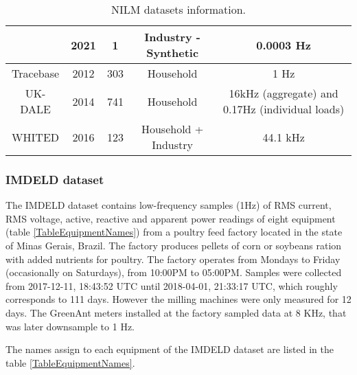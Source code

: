 \begin{table}[H]
{\begin{tabular}{|c|c|c|c|c|}
                                & 2021 & 1    & Industry - Synthetic   & 0.0003 Hz                          \\ \hline
Tracebase \cite{Tracebase}      & 2012 & 303  & Household              & 1 Hz                               \\ \hline
UK-DALE \cite{UK-DALE}          & 2014 & 741  & Household              & 16kHz (aggregate) and 0.17Hz (individual loads) \\ \hline
WHITED \cite{WHITED}            & 2016 & 123  & Household + Industry   & 44.1 kHz                           \\ \hline
\end{tabular}}
\caption{NILM datasets information.}
\label{TableNILMDatasets}
\end{table}



\subsubsection{IMDELD dataset}
The IMDELD dataset contains low-frequency samples (1Hz) of RMS current, RMS voltage, active, reactive and apparent power readings of eight equipment (table \ref{TableEquipmentNames}) from a poultry feed factory located in the state of Minas Gerais, Brazil. The factory produces pellets of corn or soybeans ration with added nutrients for poultry. The factory operates from Mondays to Friday (occasionally on Saturdays), from 10:00PM to 05:00PM. Samples were collected from 2017-12-11, 18:43:52 UTC until 2018-04-01, 21:33:17 UTC, which roughly corresponds to 111 days. However the milling machines were only measured for 12 days. The GreenAnt meters installed at the factory sampled data at 8 KHz, that was later downsample to 1 Hz.

The names assign to each equipment of the IMDELD dataset are listed in the table \ref{TableEquipmentNames}.


